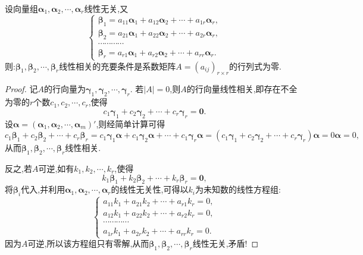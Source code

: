 \documentclass[../../main.tex]{subfiles}%
\begin{document}
\begin{proposition}\label{proposition:线性无关向量组的命题5}
设向量组\(\boldsymbol{\alpha}_1,\boldsymbol{\alpha}_2,\cdots,\boldsymbol{\alpha}_r\)线性无关,又
\[
\begin{cases}
\boldsymbol{\beta}_1 = a_{11}\boldsymbol{\alpha}_1 + a_{12}\boldsymbol{\alpha}_2+\cdots + a_{1r}\boldsymbol{\alpha}_r,\\
\boldsymbol{\beta}_2 = a_{21}\boldsymbol{\alpha}_1 + a_{22}\boldsymbol{\alpha}_2+\cdots + a_{2r}\boldsymbol{\alpha}_r,\\
\cdots\cdots\cdots\cdots\\
\boldsymbol{\beta}_r = a_{r1}\boldsymbol{\alpha}_1 + a_{r2}\boldsymbol{\alpha}_2+\cdots + a_{rr}\boldsymbol{\alpha}_r.
\end{cases}
\]
则:\(\boldsymbol{\beta}_1,\boldsymbol{\beta}_2,\cdots,\boldsymbol{\beta}_r\)线性相关的充要条件是系数矩阵\(A=(a_{ij})_{r\times r}\)的行列式为零.
\end{proposition}
\begin{proof}
记\(A\)的行向量为\(\boldsymbol{\gamma}_1,\boldsymbol{\gamma}_2,\cdots,\boldsymbol{\gamma}_r\). 若\(|A| = 0\),则\(A\)的行向量线性相关,即存在不全为零的\(r\)个数\(c_1,c_2,\cdots,c_r\),使得
\[
c_1\boldsymbol{\gamma}_1 + c_2\boldsymbol{\gamma}_2+\cdots + c_r\boldsymbol{\gamma}_r=\boldsymbol{0}.
\]
设$\boldsymbol{\alpha }=\left( \boldsymbol{\alpha }_1,\boldsymbol{\alpha }_2,\cdots ,\boldsymbol{\alpha }_m \right)'$,则经简单计算可得
\[
c_1\boldsymbol{\beta }_1+c_2\boldsymbol{\beta }_2+\cdots +c_r\boldsymbol{\beta }_r=c_1\boldsymbol{\gamma }_1\boldsymbol{\alpha }+c_1\boldsymbol{\gamma }_2\boldsymbol{\alpha }+\cdots +c_1\boldsymbol{\gamma }_r\boldsymbol{\alpha }=\left( c_1\boldsymbol{\gamma }_1+c_2\boldsymbol{\gamma }_2+\cdots +c_r\boldsymbol{\gamma }_r \right) \boldsymbol{\alpha }=0\boldsymbol{\alpha }=0,
\]
从而\(\boldsymbol{\beta}_1,\boldsymbol{\beta}_2,\cdots,\boldsymbol{\beta}_r\)线性相关.

反之,若\(A\)可逆,如有\(k_1,k_2,\cdots,k_r\),使得
\[
k_1\boldsymbol{\beta}_1 + k_2\boldsymbol{\beta}_2+\cdots + k_r\boldsymbol{\beta}_r=\boldsymbol{0},
\]
将\(\boldsymbol{\beta}_i\)代入,并利用\(\boldsymbol{\alpha}_1,\boldsymbol{\alpha}_2,\cdots,\boldsymbol{\alpha}_r\)的线性无关性,可得以\(k_i\)为未知数的线性方程组:
\[
\begin{cases}
a_{11}k_1 + a_{21}k_2+\cdots + a_{r1}k_r = 0,\\
a_{12}k_1 + a_{22}k_2+\cdots + a_{r2}k_r = 0,\\
\cdots\cdots\cdots\cdots\\
a_{1r}k_1 + a_{2r}k_2+\cdots + a_{rr}k_r = 0.
\end{cases}
\]
因为\(A\)可逆,所以该方程组只有零解,从而\(\boldsymbol{\beta}_1,\boldsymbol{\beta}_2,\cdots,\boldsymbol{\beta}_r\)线性无关,矛盾!
\end{proof}
\end{document}
